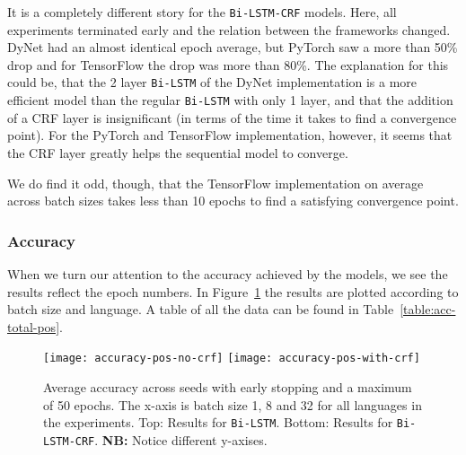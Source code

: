 It is a completely different story for the \texttt{Bi-LSTM-CRF} models. Here,
all experiments terminated early and the relation between the frameworks
changed.  DyNet had an almost identical epoch average, but PyTorch saw a more
than 50\% drop and for TensorFlow the drop was more than 80\%. The explanation
for this could be, that the 2 layer \texttt{Bi-LSTM} of the DyNet implementation
is a more efficient model than the regular \texttt{Bi-LSTM} with only 1 layer,
and that the addition of a CRF layer is insignificant (in terms of the time it
takes to find a convergence point). For the PyTorch and TensorFlow
implementation, however, it seems that the CRF layer greatly helps the
sequential model to converge.

We do find it odd, though, that the TensorFlow implementation on average across
batch sizes takes less than 10 epochs to find a satisfying convergence point.

\subsubsection{Accuracy}

When we turn our attention to the accuracy achieved by the models, we see the
results reflect the epoch numbers. In
Figure~\ref{chart:acc-by-batch-and-lang-pos} the results are plotted
according to batch size and language. A table of all the data can be found in
Table~\ref{table:acc-total-pos}.

\begin{figure}[h!]
    \texttt{[image: accuracy-pos-no-crf]}
    \texttt{[image: accuracy-pos-with-crf]}
    \caption{Average accuracy across seeds with early stopping and a maximum of
        50 epochs. The x-axis is batch size 1, 8 and 32 for all languages in the
        experiments. Top: Results for \texttt{Bi-LSTM}. Bottom: Results for
    \texttt{Bi-LSTM-CRF}. \textbf{NB:} Notice different y-axises.
    }\label{chart:acc-by-batch-and-lang-pos}
\end{figure}

